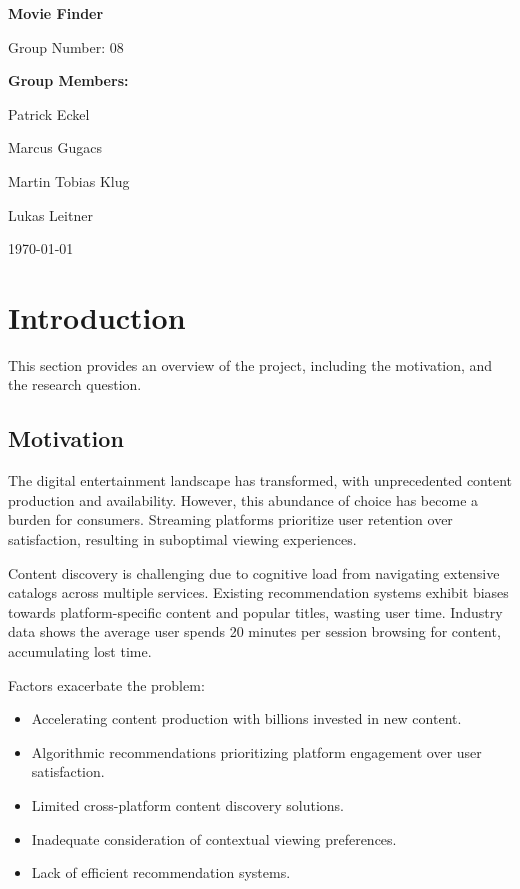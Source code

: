 \documentclass[12pt,a4paper]{article}
\begin{document}
  \begin{titlepage}
    \begin{center}
      \vspace*{2cm}
      {\huge\bfseries Movie Finder\par}
      \vspace{2cm}
      {\Large Group Number: 08\par}
      \vspace{1.5cm}
      {\large\bfseries Group Members:\par}
      \vspace{0.5cm}
      {\large
      Patrick Eckel\par
      Marcus Gugacs\par
      Martin Tobias Klug\par
      Lukas Leitner\par
      }
      \vfill
      {\large \today\par}
    \end{center}
  \end{titlepage}

  \tableofcontents
  \newpage


  \section{Introduction}

  This section provides an overview of the project, including the motivation, and the research question.

  \subsection{Motivation}

  The digital entertainment landscape has transformed, with unprecedented content production and availability.
  However, this abundance of choice has become a burden for consumers. Streaming platforms prioritize user retention
  over satisfaction, resulting in suboptimal viewing experiences.

  \noindent Content discovery is challenging due to cognitive load from navigating extensive catalogs across multiple services.
  Existing recommendation systems exhibit biases towards platform-specific content and popular titles, wasting user time.
  Industry data shows the average user spends 20 minutes per session browsing for content, accumulating lost time.

  \noindent Factors exacerbate the problem:
  \begin{itemize}
    \item Accelerating content production with billions invested in new content.
    \item Algorithmic recommendations prioritizing platform engagement over user satisfaction.
    \item Limited cross-platform content discovery solutions.
    \item Inadequate consideration of contextual viewing preferences.
    \item Lack of efficient recommendation systems.
  \end{itemize}
\end{document}
